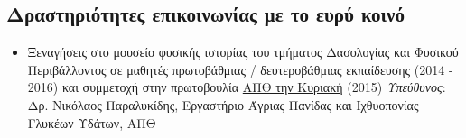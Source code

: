 \documentclass[12pt,]{scrartcl}
\begin{document}
\subsection{Δραστηριότητες επικοινωνίας με το ευρύ κοινό}\label{public_outreach}
\begin{itemize}
\vspace{-3mm}
\setlength\itemsep{-0.6em}
\item Ξεναγήσεις στο μουσείο φυσικής ιστορίας του τμήματος Δασολογίας και Φυσικού Περιβάλλοντος σε μαθητές πρωτοβάθμιας / δευτεροβάθμιας εκπαίδευσης (2014 - 2016) και συμμετοχή στην πρωτοβουλία \href{https://www.auth.gr/sites/default/files/web_final.pdf}{ΑΠΘ την Κυριακή} (2015)
\vspace{2mm}
\newline
\textit{Υπεύθυνος}: Δρ. Νικόλαος Παραλυκίδης, Εργαστήριο Άγριας Πανίδας και Ιχθυοπονίας Γλυκέων Υδάτων, ΑΠΘ
\end{itemize}




\end{document}
